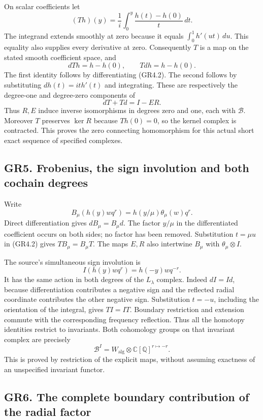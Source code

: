 On scalar coefficients let \[
(Th)(y)=\frac1i\int_0^y\frac{h(t)-h(0)}t\,dt.
\tag{GR4.2}
\] The integrand extends smoothly at zero because it equals
\(\int_0^1h'(ut)\,du\). This equality also supplies every derivative at
zero. Consequently \(T\) is a map on the stated smooth coefficient
space, and \[
dTh=h-h(0),\qquad Tdh=h-h(0).
\tag{GR4.3}
\] The first identity follows by differentiating (GR4.2). The second
follows by substituting \(dh(t)=it h'(t)\) and integrating. These are
respectively the degree-one and degree-zero components of \[
dT+Td=I-ER.
\tag{GR4.4}
\] Thus \(R,E\) induce inverse isomorphisms in degrees zero and one,
each with \(\mathcal B\). Moreover \(T\) preserves \(\ker R\) because
\(Th(0)=0\), so the kernel complex is contracted. This proves the zero
connecting homomorphism for this actual short exact sequence of
specified complexes.

\subsection{GR5. Frobenius, the sign involution and both cochain
degrees}\label{gr5.-frobenius-the-sign-involution-and-both-cochain-degrees}

Write \[
B_\mu(h(y)wq^r)=h(y/\mu)\theta_\mu(w)q^r.
\] Direct differentiation gives \(dB_\mu=B_\mu d\). The factor \(y/\mu\)
in the differentiated coefficient occurs on both sides; no factor has
been removed. Substitution \(t=\mu u\) in (GR4.2) gives
\(TB_\mu=B_\mu T\). The maps \(E,R\) also intertwine \(B_\mu\) with
\(\theta_\mu\otimes I\).

The source's simultaneous sign involution is \[
I(h(y)wq^r)=h(-y)wq^{-r}.
\tag{GR5.1}
\] It has the same action in both degrees of the \(L_\lambda\) complex.
Indeed \(dI=Id\), because differentiation contributes a negative sign
and the reflected radial coordinate contributes the other negative sign.
Substitution \(t=-u\), including the orientation of the integral, gives
\(TI=IT\). Boundary restriction and extension commute with the
corresponding frequency reflection. Thus all the homotopy identities
restrict to invariants. Both cohomology groups on that invariant complex
are precisely \[
\mathcal B^I=
W_{\mathrm{alg}}\otimes\mathbb C[\mathbb Q]^{r\mapsto-r}.
\tag{GR5.2}
\] This is proved by restriction of the explicit maps, without assuming
exactness of an unspecified invariant functor.

\subsection{GR6. The complete boundary contribution of the radial
factor}\label{gr6.-the-complete-boundary-contribution-of-the-radial-factor}

